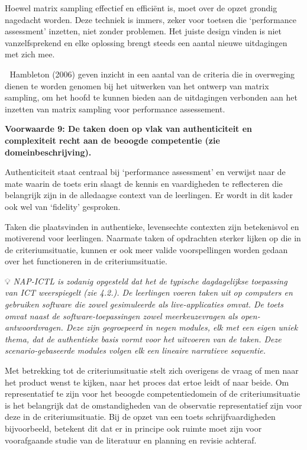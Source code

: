 \documentclass[
  letterpaper,
]{report}
\begin{document}
Hoewel matrix sampling effectief en efficiënt is, moet over de opzet
grondig nagedacht worden. Deze techniek is immers, zeker voor toetsen
die `performance assessment' inzetten, niet zonder problemen. Het juiste
design vinden is niet vanzelfsprekend en elke oplossing brengt steeds
een aantal nieuwe uitdagingen met zich mee.

📖 Hambleton (2006) geven inzicht in een aantal van de criteria die in
overweging dienen te worden genomen bij het uitwerken van het ontwerp
van matrix sampling, om het hoofd te kunnen bieden aan de uitdagingen
verbonden aan het inzetten van matrix sampling voor performance
assessement.

\textbf{Voorwaarde 9: De taken doen op vlak van authenticiteit en
complexiteit recht aan de beoogde competentie (zie domeinbeschrijving).}

Authenticiteit staat centraal bij `performance assessment' en verwijst
naar de mate waarin de toets erin slaagt de kennis en vaardigheden te
reflecteren die belangrijk zijn in de alledaagse context van de
leerlingen. Er wordt in dit kader ook wel van `fidelity' gesproken.

Taken die plaatsvinden in authentieke, levensechte contexten zijn
betekenisvol en motiverend voor leerlingen. Naarmate taken of opdrachten
sterker lijken op die in de criteriumsituatie, kunnen er ook meer valide
voorspellingen worden gedaan over het functioneren in de
criteriumsituatie.

💡 \emph{NAP-ICTL is zodanig opgesteld dat het de typische dagdagelijkse
toepassing van ICT weerspiegelt (zie 4.2.). De leerlingen voeren taken
uit op computers en gebruiken software die zowel gesimuleerde als
live-applicaties omvat. De toets omvat naast de software-toepassingen
zowel meerkeuzevragen als open-antwoordvragen. Deze zijn gegroepeerd in
negen modules, elk met een eigen uniek thema, dat de authentieke basis
vormt voor het uitvoeren van de taken. Deze scenario-gebaseerde modules
volgen elk een lineaire narratieve sequentie.}

Met betrekking tot de criteriumsituatie stelt zich overigens de vraag of
men naar het product wenst te kijken, naar het proces dat ertoe leidt of
naar beide. Om representatief te zijn voor het beoogde competentiedomein
of de criteriumsituatie is het belangrijk dat de omstandigheden van de
observatie representatief zijn voor deze in de criteriumsituatie. Bij de
opzet van een toets schrijfvaardigheden bijvoorbeeld, betekent dit dat
er in principe ook ruimte moet zijn voor voorafgaande studie van de
literatuur en planning en revisie achteraf.
\end{document}
